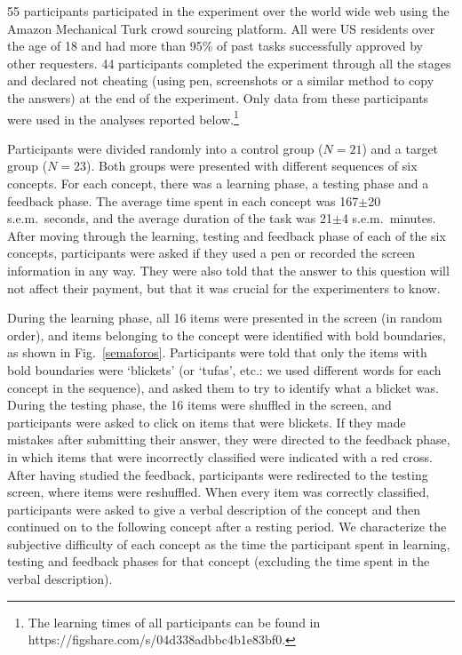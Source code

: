 
55 participants participated in the experiment over the world wide web using the Amazon Mechanical Turk crowd sourcing platform. All were US residents over the age of 18 and had more than 95\% of past tasks successfully approved by other requesters. 44 participants completed the experiment through all the stages and declared not cheating (using pen, screenshots or a similar method to copy the answers) at the end of the experiment. Only data from these participants were used in the analyses reported below.\footnote{The learning times of all participants can be found in https://figshare.com/s/04d338adbbc4b1e83bf0.}

Participants were divided randomly into a control group ($N=21$) and a target group ($N=23$). Both groups were presented with different sequences of six concepts. For each concept, there was a learning phase, a testing phase and a feedback phase. The average time spent in each concept was 167$\pm$20 s.e.m.\ seconds, and the average duration of the task was 21$\pm$4 s.e.m.\ minutes. After moving through the learning, testing and feedback phase of each of the six concepts, participants were asked if they used a pen or recorded the screen information in any way. They were also told that the answer to this question will not affect their payment, but that it was crucial for the experimenters to know.


During the learning phase, all 16 items were presented in the screen (in random order), and items belonging to the concept were identified with bold boundaries, as shown in  Fig.~\ref{semaforos}.
Participants were told that only the items with bold boundaries were `blickets' (or `tufas', etc.: we used different words for each concept in the sequence), and asked them to try to identify what a blicket was. During the testing phase, the 16 items were shuffled in the screen, and participants were asked to click on items that were blickets. If they made mistakes after submitting their answer, they were directed to the feedback phase, in which items that were incorrectly classified were indicated with a red cross. After having studied the feedback, participants were redirected to the testing screen, where items were reshuffled. When every item was correctly classified, participants were asked to give a verbal description of the concept and then continued on to the following concept after a resting period. We characterize the subjective difficulty of each concept as the time the participant spent in learning, testing and feedback phases for that concept (excluding the time spent in the verbal description).


